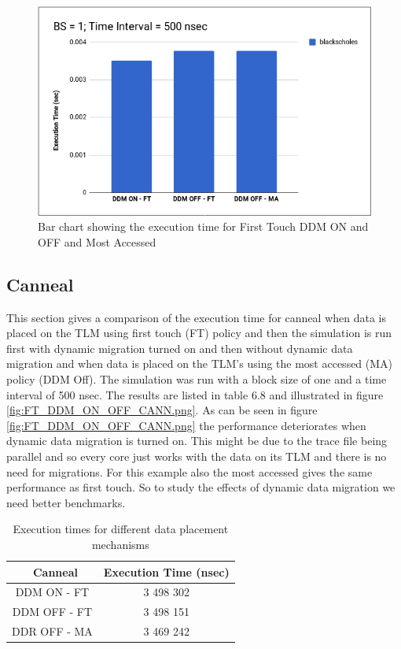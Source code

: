 \documentclass{listhesis}
\begin{document}
\begin{figure}
  \includegraphics[width=\linewidth]{FT_DDM_ON_OFF_BLACK.png}
  \centering
  \caption{Bar chart showing the execution time for First Touch DDM ON and OFF and Most Accessed}
  \label{fig:FT_DDM_ON_OFF_BLACK.png}
\end{figure}

\subsection{Canneal}
This section gives a comparison of the execution time for canneal when data is placed on the TLM using first touch (FT) policy and then the simulation is run first with dynamic migration turned on and then without dynamic data migration and when data is placed on the TLM's using the most accessed (MA) policy (DDM Off). The simulation was run with a block size of one and a time interval of 500 nsec. The results are listed in table 6.8 and illustrated in figure \ref{fig:FT_DDM_ON_OFF_CANN.png}. As can be seen in figure \ref{fig:FT_DDM_ON_OFF_CANN.png} the performance deteriorates when dynamic data migration is turned on. This might be due to the trace file being parallel and so every core just works with the data on its TLM and there is no need for migrations. For this example also the most accessed gives the same performance as first touch. So to study the effects of dynamic data migration we need better benchmarks. \\

\begin{table}[h!]
\begin{center}
 \begin{tabular}{|| c | c ||} 
 \hline
 \ \textbf{Canneal}  & \textbf{Execution Time (nsec)}\\ [0.5 ex] 
 \hline\hline
   DDM ON - FT & 3 498 302 \\ 
 \hline
   DDM OFF - FT & 3 498 151 \\
 \hline
   DDR OFF - MA & 3 469 242 \\
 \hline
\end{tabular}
 \caption{Execution times for different data placement mechanisms}
 \label{table:ExecTimes5}
\end{center}
\end{table}
\end{document}
